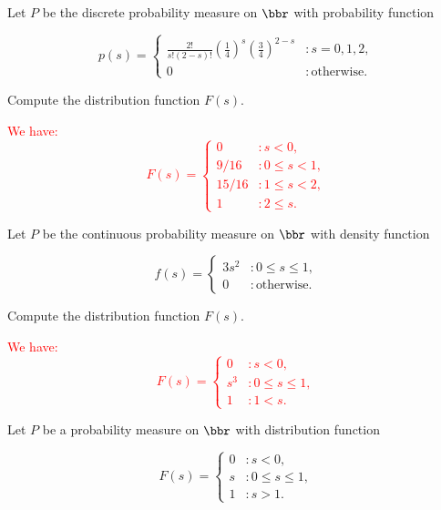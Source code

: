\documentclass[12pt,reqno]{amsart}
\begin{document}
\bigskip
\prob Let $P$ be the discrete probability measure on $\bbr$ with probability function

    \[p(s) = \begin{cases}
        \frac{2!}{s!(2-s)!} \left( \frac{1}{4} \right)^s \left(\frac{3}{4} \right)^{2-s} & : s=0, 1, 2, \\
        0 & :\text{otherwise}.
    \end{cases}\]

Compute the distribution function $F(s)$.

\bigskip
\textcolor{red}{We have:
    \[F(s) = \begin{cases}
        0 & : s < 0, \\
        9/16 & : 0 \leq s < 1, \\
        15/16 & : 1 \leq s < 2, \\
        1 & : 2\leq s.
    \end{cases}\]}













\bigskip
\prob Let $P$ be the continuous probability measure on $\bbr$ with density function

    \[f(s) = \begin{cases}
        3s^2 & : 0 \leq s \leq 1, \\
        0 & : \text{otherwise}.
    \end{cases}\]

Compute the distribution function $F(s)$.

\bigskip
\textcolor{red}{We have:
    \[F(s) = \begin{cases}
        0 & : s < 0, \\
        s^3 & : 0 \leq s \leq 1, \\
        1 & : 1 < s.
    \end{cases}\]}













\bigskip
\prob Let $P$ be a probability measure on $\bbr$ with distribution function

    \[F(s) = \begin{cases}
        0 & : s < 0, \\
        s & : 0\leq s \leq 1, \\
        1 & : s>1.
    \end{cases}\]
\end{document}
